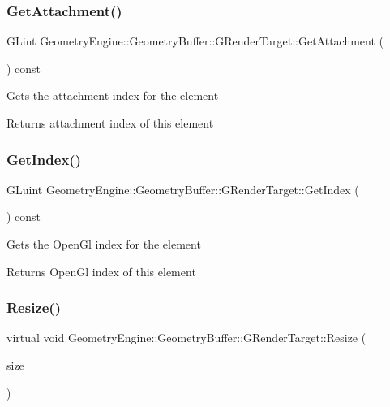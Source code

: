 \subsubsection{\texorpdfstring{GetAttachment()}{GetAttachment()}}
{\footnotesize\ttfamily G\+Lint Geometry\+Engine\+::\+Geometry\+Buffer\+::\+G\+Render\+Target\+::\+Get\+Attachment (\begin{DoxyParamCaption}{ }\end{DoxyParamCaption}) const\hspace{0.3cm}{\ttfamily [inline]}}

Gets the attachment index for the element \begin{DoxyReturn}{Returns}
attachment index of this element 
\end{DoxyReturn}
\mbox{\label{class_geometry_engine_1_1_geometry_buffer_1_1_g_render_target_a68bde2ce731945e3f5668001403b1fed}} 
\subsubsection{\texorpdfstring{GetIndex()}{GetIndex()}}
{\footnotesize\ttfamily G\+Luint Geometry\+Engine\+::\+Geometry\+Buffer\+::\+G\+Render\+Target\+::\+Get\+Index (\begin{DoxyParamCaption}{ }\end{DoxyParamCaption}) const\hspace{0.3cm}{\ttfamily [inline]}}

Gets the Open\+Gl index for the element \begin{DoxyReturn}{Returns}
Open\+Gl index of this element 
\end{DoxyReturn}
\mbox{\label{class_geometry_engine_1_1_geometry_buffer_1_1_g_render_target_ac1e54f456408b53de44fe10116d649dd}} 
\subsubsection{\texorpdfstring{Resize()}{Resize()}}
{\footnotesize\ttfamily virtual void Geometry\+Engine\+::\+Geometry\+Buffer\+::\+G\+Render\+Target\+::\+Resize (\begin{DoxyParamCaption}\item[{const Q\+Vector2D \&}]{size }\end{DoxyParamCaption})\hspace{0.3cm}{\ttfamily [pure virtual]}}

